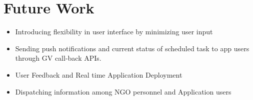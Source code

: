 \section{Future Work}

\begin{itemize}
\item Introducing flexibility in user interface by minimizing user input
\item Sending push notifications and current status of scheduled task to app users through GV call-back APIs.
\item User Feedback and Real time Application Deployment
\item Dispatching information among NGO personnel and Application users 
\end{itemize}